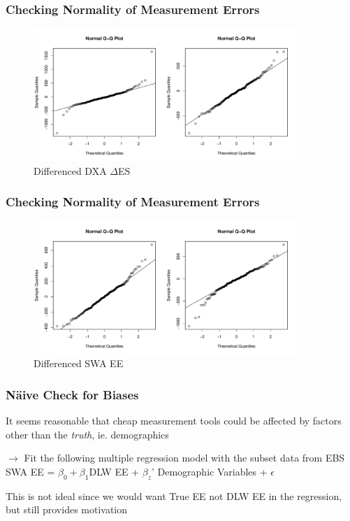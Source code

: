 \documentclass[handout]{beamer}\usepackage[]{graphicx}\usepackage[]{color}
\begin{document}
\begin{frame}
\frametitle{Checking Normality of Measurement Errors}

\begin{figure}
\centering
\includegraphics[width=10cm,height=5cm]{dxa_qq.pdf}
\caption{\small{Differenced DXA $\Delta$ES }}
\end{figure}

\end{frame}

\begin{frame}
\frametitle{Checking Normality of Measurement Errors}


\begin{figure}
\centering
\includegraphics[width=10cm,height=5cm]{swa_qq.pdf}
\caption{Differenced SWA  EE }
\end{figure}


\end{frame}

\begin{frame}
\frametitle{N{\"a}ive Check for Biases}
It seems reasonable that cheap measurement tools could be affected by factors other than the \emph{truth}, ie. demographics \\

\vspace{0.3cm}

$\rightarrow$ Fit the following multiple regression model with the subset data from EBS\\
SWA EE = $\beta_0 + \beta_1$DLW EE + $\beta_z$' Demographic Variables + $\epsilon$ \\

\vspace{0.3cm}

This is not ideal since we would want True EE not DLW EE in the regression, but still provides motivation


\end{frame}
\end{document}
